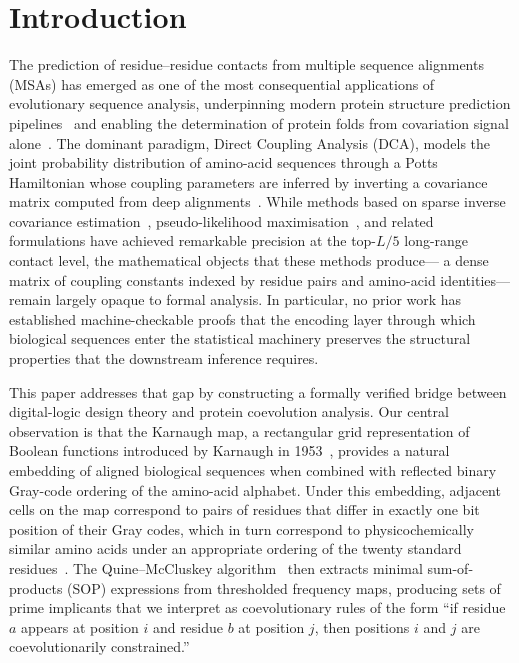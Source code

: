 \section{Introduction}
\label{sec:intro}

The prediction of residue--residue contacts from multiple sequence alignments
(MSAs) has emerged as one of the most consequential applications of
evolutionary sequence analysis, underpinning modern protein structure
prediction pipelines~\cite{jumper2021} and enabling the determination of
protein folds from covariation signal alone~\cite{weigt2009}.  The dominant
paradigm, Direct Coupling Analysis (DCA), models the joint probability
distribution of amino-acid sequences through a Potts Hamiltonian whose
coupling parameters are inferred by inverting a covariance matrix computed
from deep alignments~\cite{morcos2011}.  While methods based on sparse inverse
covariance estimation~\cite{jones2012}, pseudo-likelihood maximisation~\cite{ekeberg2013},
and related formulations have achieved remarkable precision at the top-$L/5$
long-range contact level, the mathematical objects that these methods produce---%
a dense matrix of coupling constants indexed by residue pairs and amino-acid
identities---remain largely opaque to formal analysis.  In particular, no prior
work has established machine-checkable proofs that the encoding layer through
which biological sequences enter the statistical machinery preserves the
structural properties that the downstream inference requires.

This paper addresses that gap by constructing a formally verified bridge
between digital-logic design theory and protein coevolution analysis.  Our
central observation is that the Karnaugh map, a rectangular grid representation
of Boolean functions introduced by Karnaugh in 1953~\cite{karnaugh1953},
provides a natural embedding of aligned biological sequences when combined
with reflected binary Gray-code ordering of the amino-acid alphabet.  Under
this embedding, adjacent cells on the map correspond to pairs of residues that
differ in exactly one bit position of their Gray codes, which in turn
correspond to physicochemically similar amino acids under an appropriate
ordering of the twenty standard residues~\cite{he2012}.  The Quine--McCluskey
algorithm~\cite{quine1952,mccluskey1956} then extracts minimal sum-of-products
(SOP) expressions from thresholded frequency maps, producing sets of prime
implicants that we interpret as coevolutionary rules of the form ``if residue
$a$ appears at position $i$ and residue $b$ at position $j$, then positions
$i$ and $j$ are coevolutionarily constrained.''

